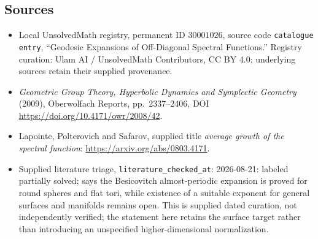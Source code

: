 \documentclass[11pt]{article}
\begin{document}
\subsection{Sources}
\begin{itemize}
\item Local UnsolvedMath registry, permanent ID \(30001026\), source code \texttt{catalogue entry}, ``Geodesic Expansions of Off-Diagonal Spectral Functions.'' Registry curation: Ulam AI / UnsolvedMath Contributors, CC BY 4.0; underlying sources retain their supplied provenance.
\item \emph{Geometric Group Theory, Hyperbolic Dynamics and Symplectic Geometry} (2009), Oberwolfach Reports, pp.\ 2337--2406, DOI \url{https://doi.org/10.4171/owr/2008/42}.
\item Lapointe, Polterovich and Safarov, supplied title \emph{average growth of the spectral function}: \url{https://arxiv.org/abs/0803.4171}.
\item Supplied literature triage, \texttt{literature\_checked\_at}: 2026-08-21: labeled partially solved; says the Besicovitch almost-periodic expansion is proved for round spheres and flat tori, while existence of a suitable exponent for general surfaces and manifolds remains open. This is supplied dated curation, not independently verified; the statement here retains the surface target rather than introducing an unspecified higher-dimensional normalization.
\end{itemize}
\end{document}
